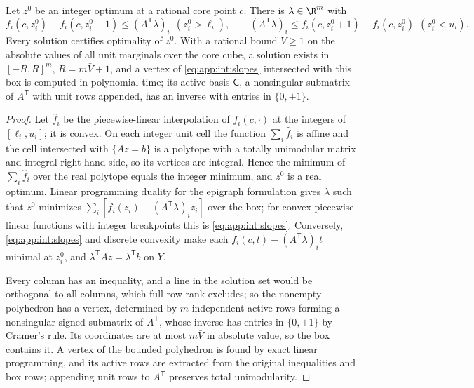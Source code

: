 \begin{lemma}\label{lem:int:tu-dual}
Let $z^0$ be an integer optimum at a rational core point $c$. There is
$\lambda\in\R^m$ with
\begin{equation}\label{eq:app:int:slopes}
 f_i(c,z^0_i)-f_i(c,z^0_i-1)\le(A^{\mathsf T}\lambda)_i\ \ (z^0_i>\ell_i),\qquad
 (A^{\mathsf T}\lambda)_i\le f_i(c,z^0_i+1)-f_i(c,z^0_i)\ \ (z^0_i<u_i).
\end{equation}
Every solution certifies optimality of $z^0$. With a rational bound $\bar V\ge1$ on the
absolute values of all unit marginals over the core cube, a solution exists in
$[-R,R]^m$, $R=m\bar V+1$, and a vertex of \eqref{eq:app:int:slopes} intersected with this
box is computed in polynomial time; its active basis $\mathsf C$, a nonsingular
submatrix of $A^{\mathsf T}$ with unit rows appended, has an inverse with entries in
$\{0,\pm1\}$.
\end{lemma}

\begin{proof}
Let $\hat f_i$ be the piecewise-linear interpolation of $f_i(c,\cdot)$ at the integers of
$[\ell_i,u_i]$; it is convex. On each integer unit cell the function
$\sum_i\hat f_i$ is affine and the cell intersected with $\{Az=b\}$ is a polytope with a
totally unimodular matrix and integral right-hand side, so its vertices are integral.
Hence the minimum of $\sum_i\hat f_i$ over the real polytope equals the integer minimum,
and $z^0$ is a real optimum. Linear programming duality for the epigraph formulation
gives $\lambda$ such that $z^0$ minimizes $\sum_i[\hat f_i(z_i)-(A^{\mathsf T}\lambda)_iz_i]$
over the box; for convex piecewise-linear functions with integer breakpoints this is
\eqref{eq:app:int:slopes}. Conversely, \eqref{eq:app:int:slopes} and discrete convexity
make each $f_i(c,t)-(A^{\mathsf T}\lambda)_it$ minimal at $z^0_i$, and
$\lambda^{\mathsf T}Az=\lambda^{\mathsf T}b$ on $Y$.

Every column has an inequality, and a line in the solution set would be orthogonal to
all columns, which full row rank excludes; so the nonempty polyhedron has a vertex,
determined by $m$ independent active rows forming a nonsingular signed submatrix of
$A^{\mathsf T}$, whose inverse has entries in $\{0,\pm1\}$ by Cramer's rule. Its
coordinates are at most $m\bar V$ in absolute value, so the box contains it. A vertex of
the bounded polyhedron is found by exact linear programming, and its active rows are
extracted from the original inequalities and box rows; appending unit rows to
$A^{\mathsf T}$ preserves total unimodularity.
\end{proof}

